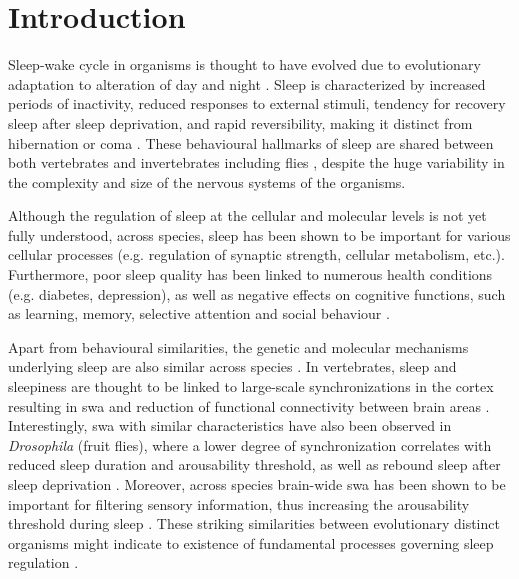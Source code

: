 \documentclass[../main.tex]{subfiles}
\begin{document}
\section{Introduction} \label{sec:introduction}

Sleep-wake cycle in organisms is thought to have evolved due to evolutionary
adaptation to alteration of day and night \parencite{suarez-grimaltNeuralArchitectureSleep2021}.
Sleep is characterized by increased periods of inactivity, reduced responses to external stimuli,
tendency for recovery sleep after sleep deprivation, and rapid reversibility, making it
distinct from hibernation or coma
\parencite{shaferRegulationDrosophilaSleep2021,andreaniCircadianProgrammingEllipsoid2022,donleaRecurrentCircuitryBalancing2018}.
These behavioural hallmarks of sleep are shared between both vertebrates and invertebrates
including flies \parencite{shaferRegulationDrosophilaSleep2021,andreaniCircadianProgrammingEllipsoid2022},
despite the huge variability in the complexity and size of the nervous systems of the organisms.

Although the regulation of sleep at the cellular and molecular levels is not yet fully understood, across species, sleep has been shown to be important for various cellular processes (e.g. regulation of synaptic strength, cellular metabolism, etc.). Furthermore, poor sleep quality has been linked to numerous health conditions (e.g. diabetes, depression), as well as negative effects on cognitive functions, such as learning, memory, selective attention and social behaviour \parencite{shaferRegulationDrosophilaSleep2021,dubowyCircadianRhythmsSleep2017,suarez-grimaltNeuralArchitectureSleep2021}.

Apart from behavioural similarities, the genetic and molecular mechanisms underlying
sleep are also similar across species \parencite{dubowyCircadianRhythmsSleep2017}.
In vertebrates, sleep and sleepiness are thought to be linked to large-scale synchronizations in the cortex resulting in \gls{swa} and reduction of functional connectivity between brain areas \parencite{suarez-grimaltNeuralArchitectureSleep2021,raccugliaNetworkSpecificSynchronizationElectrical2019}.
Interestingly, \gls{swa} with similar characteristics have also been observed in \textit{Drosophila} (fruit flies), where a lower degree of synchronization correlates with reduced sleep duration and arousability
threshold, as well as rebound sleep after sleep deprivation
\parencite{raccugliaNetworkSpecificSynchronizationElectrical2019}. Moreover, across species brain-wide
\gls{swa} has been shown to be important for filtering sensory information, thus increasing the
arousability threshold during sleep \parencite{raccugliaCoherentMultilevelNetwork2022}. These
striking similarities between evolutionary distinct organisms might indicate to existence of
fundamental processes governing sleep regulation \parencite{suarez-grimaltNeuralArchitectureSleep2021}.
\end{document}
